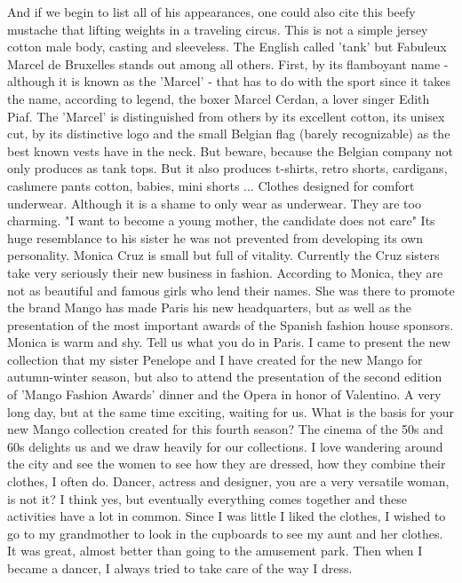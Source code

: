 And if we begin to list all of his appearances, one could also cite this beefy mustache that lifting weights in a traveling circus.
This is not a simple jersey cotton male body, casting and sleeveless.
The English called 'tank' but Fabuleux Marcel de Bruxelles stands out among all others.
First, by its flamboyant name - although it is known as the 'Marcel' - that has to do with the sport since it takes the name, according to legend, the boxer Marcel Cerdan, a lover singer Edith Piaf.
The 'Marcel' is distinguished from others by its excellent cotton, its unisex cut, by its distinctive logo and the small Belgian flag (barely recognizable) as the best known vests have in the neck.
But beware, because the Belgian company not only produces as tank tops.
But it also produces t-shirts, retro shorts, cardigans, cashmere pants cotton, babies, mini shorts ...
Clothes designed for comfort underwear.
Although it is a shame to only wear as underwear.
They are too charming.
"I want to become a young mother, the candidate does not care"
Its huge resemblance to his sister he was not prevented from developing its own personality.
Monica Cruz is small but full of vitality.
Currently the Cruz sisters take very seriously their new business in fashion.
According to Monica, they are not as beautiful and famous girls who lend their names.
She was there to promote the brand Mango has made Paris his new headquarters, but as well as the presentation of the most important awards of the Spanish fashion house sponsors.
Monica is warm and shy.
Tell us what you do in Paris.
I came to present the new collection that my sister Penelope and I have created for the new Mango for autumn-winter season, but also to attend the presentation of the second edition of 'Mango Fashion Awards' dinner and the Opera in honor of Valentino.
A very long day, but at the same time exciting, waiting for us.
What is the basis for your new Mango collection created for this fourth season?
The cinema of the 50s and 60s delights us and we draw heavily for our collections.
I love wandering around the city and see the women to see how they are dressed, how they combine their clothes, I often do.
Dancer, actress and designer, you are a very versatile woman, is not it?
I think yes, but eventually everything comes together and these activities have a lot in common.
Since I was little I liked the clothes, I wished to go to my grandmother to look in the cupboards to see my aunt and her clothes.
It was great, almost better than going to the amusement park.
Then when I became a dancer, I always tried to take care of the way I dress.
